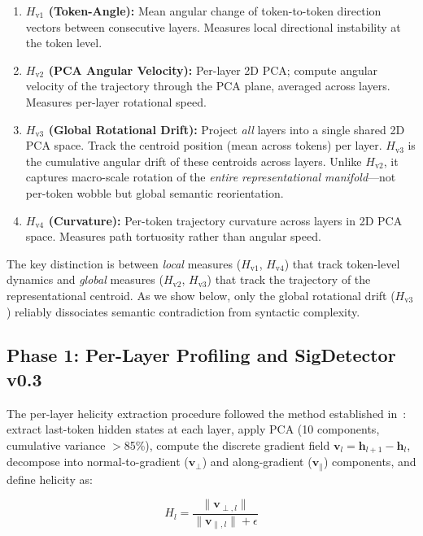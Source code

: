 \documentclass[12pt,a4paper]{article}
\begin{document}
\begin{enumerate}[leftmargin=*]
    \item \textbf{$H_{\text{v1}}$ (Token-Angle):} Mean angular change of token-to-token direction vectors between consecutive layers. Measures local directional instability at the token level.
    \item \textbf{$H_{\text{v2}}$ (PCA Angular Velocity):} Per-layer 2D PCA; compute angular velocity of the trajectory through the PCA plane, averaged across layers. Measures per-layer rotational speed.
    \item \textbf{$H_{\text{v3}}$ (Global Rotational Drift):} Project \textit{all} layers into a single shared 2D PCA space. Track the centroid position (mean across tokens) per layer. $H_{\text{v3}}$ is the cumulative angular drift of these centroids across layers. Unlike $H_{\text{v2}}$, it captures macro-scale rotation of the \textit{entire representational manifold}---not per-token wobble but global semantic reorientation.
    \item \textbf{$H_{\text{v4}}$ (Curvature):} Per-token trajectory curvature across layers in 2D PCA space. Measures path tortuosity rather than angular speed.
\end{enumerate}

The key distinction is between \textit{local} measures ($H_{\text{v1}}$, $H_{\text{v4}}$) that track token-level dynamics and \textit{global} measures ($H_{\text{v2}}$, $H_{\text{v3}}$) that track the trajectory of the representational centroid. As we show below, only the global rotational drift ($H_{\text{v3}}$) reliably dissociates semantic contradiction from syntactic complexity.

\subsection{Phase 1: Per-Layer Profiling and SigDetector v0.3}

The per-layer helicity extraction procedure followed the method established in~\cite{DR_MM_2025c}: extract last-token hidden states at each layer, apply PCA (10 components, cumulative variance $>$85\%), compute the discrete gradient field $\mathbf{v}_l = \mathbf{h}_{l+1} - \mathbf{h}_l$, decompose into normal-to-gradient ($\mathbf{v}_\perp$) and along-gradient ($\mathbf{v}_\parallel$) components, and define helicity as:

\begin{equation}
    H_l = \frac{\|\mathbf{v}_{\perp,l}\|}{\|\mathbf{v}_{\parallel,l}\| + \epsilon}
    \label{eq:helicity}
\end{equation}
\end{document}
